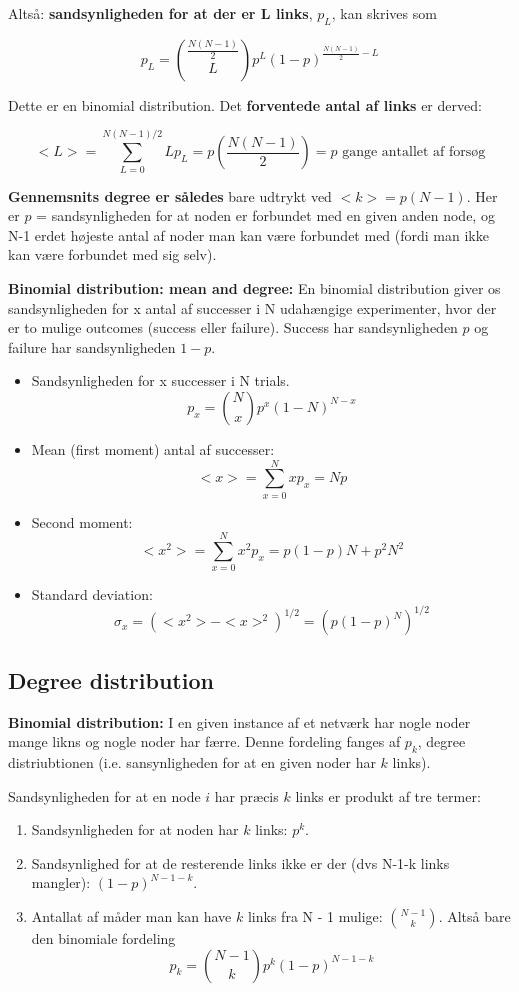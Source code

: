 \documentclass[11pt]{article}
\begin{document}
Altså: \textbf{sandsynligheden for at der er L links}, \(p_{L}\), kan skrives som

$$ p_{L} = \binom{\frac{N(N-1)}{2}}{L} p^{L} (1 - p)^{\frac{N(N-1)}{2} - L} $$

Dette er en binomial distribution. Det \textbf{forventede antal af links} er derved: 

$$ <L> = \sum^{N(N-1)/2}_{L = 0} L p_{L} = p(\frac{N(N-1)}{2}) = p \text{ gange antallet af forsøg} $$

\textbf{Gennemsnits degree er således} bare udtrykt ved \(<k> = p(N-1)\). Her er \(p\) = sandsynligheden for at noden er forbundet med en given anden node, og N-1 erdet højeste antal af noder man kan være forbundet med (fordi man ikke kan være forbundet med sig selv).

\textbf{Binomial distribution: mean and degree:} En binomial distribution giver os sandsynligheden for x antal af successer i N udahængige experimenter, hvor der er to mulige outcomes (success eller failure). Success har sandsynligheden \(p\) og failure har sandsynligheden \(1 - p\).

\begin{itemize}
\item Sandsynligheden for x successer i N trials. $$ p_{x} = \binom{N}{x} p^{x} (1 - N)^{N-x} $$

\item Mean (first moment) antal af successer: $$ <x> = \sum^{N}_{x = 0} x p_{x} = Np $$

\item Second moment: $$ <x^2> = \sum^{N}_{x=0} x^2 p_{x} = p(1-p)N+p^2N^2$$

\item Standard deviation: $$ \sigma_{x} = (<x^2> - <x>^2)^{1/2} = (p(1-p)^N)^{1/2} $$
\end{itemize}

\subsection{Degree distribution}
\label{sec:org2d69a41}
\textbf{Binomial distribution:} I en given instance af et netværk har nogle noder mange likns og nogle noder har færre. Denne fordeling fanges af \(p_{k}\), degree distriubtionen (i.e. sansynligheden for at en given noder har \(k\) links).

Sandsynligheden for at en node \(i\) har præcis \(k\) links er produkt af tre termer: 

\begin{enumerate}
\item Sandsynligheden for at noden har \(k\) links: \(p^k\).
\item Sandsynlighed for at de resterende links ikke er der (dvs N-1-k links mangler): \((1 - p)^{N - 1 - k}\).
\item Antallat af måder man kan have \(k\) links fra N - 1 mulige: \(\binom{N-1}{k}\). Altså bare den binomiale fordeling $$ p_{k} = \binom{N - 1}{k} p^{k} (1-p)^{N - 1 - k} $$
\end{enumerate}
\end{document}
